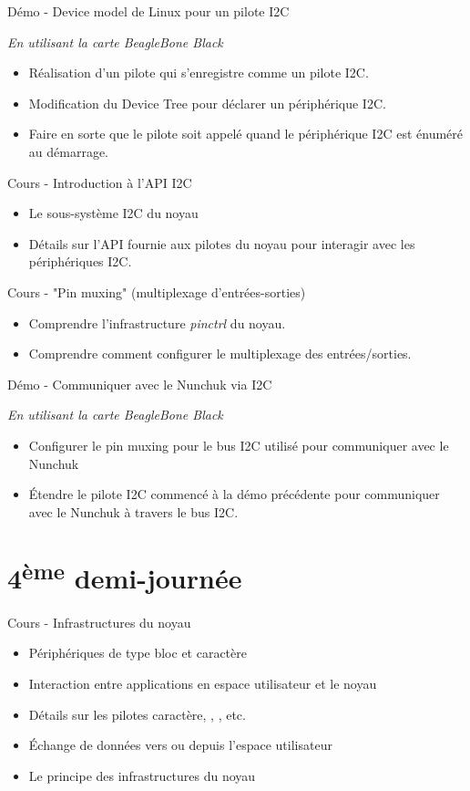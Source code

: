 \documentclass[a4paper,12pt,obeyspaces,spaces,hyphens]{article}
\begin{document}
\feagendaonecolumn
{Démo - Device model de Linux pour un pilote I2C}
{
  {\em En utilisant la carte BeagleBone Black}
  \begin{itemize}
  \item Réalisation d'un pilote qui s'enregistre comme
     un pilote I2C.
  \item Modification du Device Tree pour déclarer un
     périphérique I2C.
  \item Faire en sorte que le pilote soit appelé quand le
     périphérique I2C est énuméré au démarrage.
  \end{itemize}
}

\feagendatwocolumn
{Cours - Introduction à l'API I2C}
{
  \begin{itemize}
  \item Le sous-système I2C du noyau
  \item Détails sur l'API fournie aux pilotes du noyau pour interagir
    avec les périphériques I2C.
  \end{itemize}
}
{Cours - "Pin muxing" (multiplexage d'entrées-sorties)}
{
  \begin{itemize}
  \item Comprendre l'infrastructure {\em pinctrl} du noyau.
  \item Comprendre comment configurer le multiplexage des
    entrées/sorties.
  \end{itemize}
}

\feagendaonecolumn
{Démo - Communiquer avec le Nunchuk via I2C}
{
  {\em En utilisant la carte BeagleBone Black}
  \begin{itemize}
  \item Configurer le pin muxing pour le bus I2C utilisé pour
    communiquer avec le Nunchuk
  \item Étendre le pilote I2C commencé à la démo précédente pour
    communiquer avec le Nunchuk à travers le bus I2C.
  \end{itemize}
}

\section{4\textsuperscript{ème} demi-journée}

\feagendaonecolumn
{Cours - Infrastructures du noyau}
{
  \begin{itemize}
  \item Périphériques de type bloc et caractère
  \item Interaction entre applications en espace utilisateur et le noyau
  \item Détails sur les pilotes caractère,  ,
    , etc.
  \item Échange de données vers ou depuis l'espace utilisateur
  \item Le principe des infrastructures du noyau
  \end{itemize}
}
\end{document}
